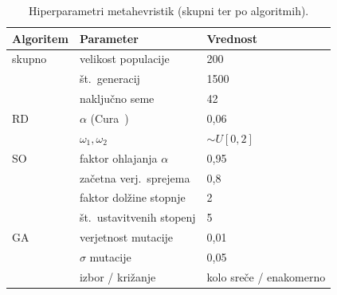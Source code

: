 \begin{table}[htbp]
  \centering
  \caption{Hiperparametri metahevristik (skupni ter po algoritmih).}
  \label{tab:hp-solver}
  \begin{tabular}{lll}
    \toprule
    Algoritem & Parameter & Vrednost\\
    \midrule
    skupno & velikost populacije & 200\\
           & št.\ generacij      & 1500\\
           & naključno seme                & 42\\
    \midrule
    RD    & $\alpha$ (Cura~\cite{cura2009}) & 0{,}06\\
           & $\omega_1,\omega_2$ & $\sim U[0,2]$\\
    \midrule
    SO     & faktor ohlajanja $\alpha$ & 0{,}95\\
           & začetna verj.\ sprejema   & 0{,}8\\
           & faktor dolžine stopnje     & 2\\
           & št.\ ustavitvenih stopenj  & 5\\
    \midrule
    GA     & verjetnost mutacije & 0{,}01\\
           & $\sigma$ mutacije    & 0{,}05\\
           & izbor / križanje     & kolo sreče / enakomerno\\
    \bottomrule
  \end{tabular}
\end{table}
